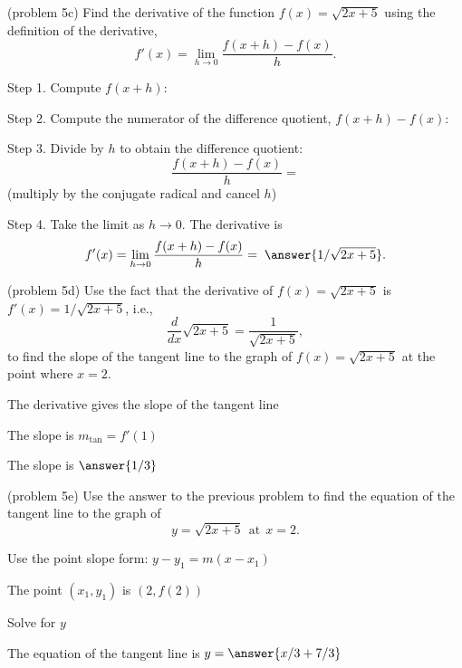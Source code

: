 \documentclass[handout]{ximera}
\begin{document}
\begin{problem}(problem 5c)
Find the derivative of the function $f(x) = \sqrt{2x + 5}$ using the definition of the derivative,
\[
f'(x) = \lim_{h \to 0} \frac{f(x+h) - f(x)}{h}.
\]

Step 1. Compute $f(x + h)$:
\begin{multipleChoice}
\end{multipleChoice}


Step 2. Compute the numerator of the difference quotient, $f(x+h) - f(x)$:
\begin{multipleChoice}
\end{multipleChoice}


Step 3. Divide by $h$ to obtain the difference quotient:
\[
\frac{f(x+h) - f(x)}{h} = 
\]
(multiply by the conjugate radical and cancel $h$)
\begin{multipleChoice}
\end{multipleChoice}

Step 4. Take the limit as $h \to 0$. The derivative is
\[
f'(x) = \lim_{h \to 0} \frac{f(x+h) - f(x)}{h} = \; \answer{1/\sqrt{2x+5}}.
\]
\end{problem} 


\begin{problem}(problem 5d)
Use the fact that the derivative of $f(x) = \sqrt{2x + 5}$ is $f'(x) = 1/\sqrt{2x+5}$,
i.e., 
\[
\frac{d}{dx}\sqrt{2x+5} = \frac{1}{\sqrt{2x+5}},
\]
to find the slope of the tangent line to the graph of 
$f(x) = \sqrt{2x+5}$ at the point where $x = 2$.\\
\begin{hint}
The derivative gives the slope of the tangent line
\end{hint}
\begin{hint}
The slope is $m_{\text{tan}} = f'(1)$
\end{hint}
The slope is $\answer{1/3}$
\end{problem}

\begin{problem}(problem 5e)
Use the answer to the previous problem to find the equation of the tangent line to the graph of 
\[
y = \sqrt{2x+5} \ \ \text{at} \ \ x=2.
\]
\begin{hint}
Use the point slope form: $y-y_1 = m(x-x_1)$
\end{hint}
\begin{hint}
The point $(x_1,y_1)$ is $(2, f(2))$
\end{hint}
\begin{hint}
Solve for $y$
\end{hint}
The equation of the tangent line is \; $y = \answer{x/3 + 7/3}$
\end{problem}
\end{document}
